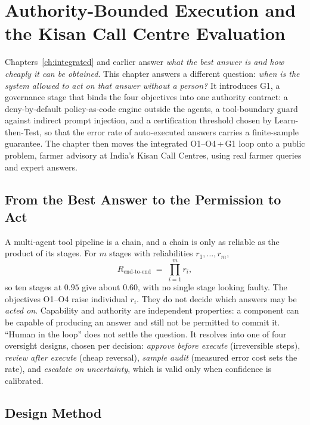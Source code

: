 \chapter{Authority-Bounded Execution and the Kisan Call Centre Evaluation}
\label{ch:governance}

\begin{chaptersummary}
Chapters~\ref{ch:integrated} and earlier answer \emph{what the best answer is and how cheaply it can
be obtained}. This chapter answers a different question: \emph{when is the system allowed to act on
that answer without a person?} It introduces G1, a governance stage that binds the four objectives
into one authority contract: a deny-by-default policy-as-code engine outside the agents, a
tool-boundary guard against indirect prompt injection, and a certification threshold chosen by
Learn-then-Test, so that the error rate of auto-executed answers carries a finite-sample guarantee.
The chapter then moves the integrated O1--O4\,+\,G1 loop onto a public problem, farmer advisory at
India's Kisan Call Centres, using real farmer queries and expert answers.
\end{chaptersummary}

\section{From the Best Answer to the Permission to Act}
\label{sec:gov-motivation}

A multi-agent tool pipeline is a chain, and a chain is only as reliable as the product of its stages.
For $m$ stages with reliabilities $r_1,\dots,r_m$,
\begin{equation}
  R_{\text{end-to-end}} \;=\; \prod_{i=1}^{m} r_i ,
  \label{eq:gov-compound}
\end{equation}
so ten stages at $0.95$ give about $0.60$, with no single stage looking faulty. The objectives O1--O4
raise individual $r_i$. They do not decide which answers may be \emph{acted on}. Capability and
authority are independent properties: a component can be capable of producing an answer and still
not be permitted to commit it. ``Human in the loop'' does not settle the question. It resolves into
one of four oversight designs, chosen per decision:
\emph{approve before execute} (irreversible steps),
\emph{review after execute} (cheap reversal),
\emph{sample audit} (measured error cost sets the rate), and
\emph{escalate on uncertainty}, which is valid only when confidence is calibrated.

\section{Design Method}
\label{sec:gov-method}

